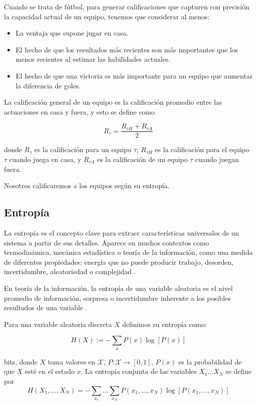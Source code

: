 Cuando se trata de fútbol, para generar calificaciones que capturen con precisión la
capacidad actual de un equipo, tenemos que considerar al menos:
\begin{itemize}
    \item La ventaja que supone jugar en casa.
    \item El hecho de que los resultados más recientes son más importantes que los menos recientes
    al estimar las habilidades actuales.
    \item El hecho de que una victoria es más importante para un equipo que aumentar la diferencia de goles.
\end{itemize}

\begin{definicion} \label{def:ratings}
La calificación general de un equipo es la calificación promedio entre las actuaciones 
en casa y fuera, y esto se define como

$$ R_{\tau}= \frac{R_{\tau H} + R_{\tau A}}{2} $$

donde $R_{\tau}$ es la calificación para un equipo $\tau$, $R_{\tau H}$ es la calificación para el 
equipo $\tau$ cuando juega en casa, y $R_{\tau A}$ es la calificación de un equipo $\tau$ cuando 
juegan fuera. 
\end{definicion}

Nosotros calificaremos a los equipos según su entropía.

\subsection{Entropía}
La entropía es el concepto clave para extraer características universales de un sistema a partir de sus 
detalles. Aparece en muchos contextos como termodinámica, mecánica estadística o teoría de la información, como 
una medida de diferentes propiedades: energía que no puede producir trabajo, desorden, incertidumbre, 
aleatoriedad o complejidad \cite{gen-entr-review}.

En teoría de la información, la entropía de una variable aleatoria es el nivel promedio de información, 
sorpresa o incertidumbre inherente a los posibles resultados de una variable \cite{t-entropy}.
\begin{definicion}[Entropía] \label{def:entropy}
Para una variable aleatoria discreta $X$ definimos su entropía como:  

$$H(X):= - \sum_{x} P(x)\log[P(x)]$$

bits, donde $X$ toma valores en $\mathcal{X}$, $P:\mathcal{X} \rightarrow [0,1]$, $P(x)$ es la 
probabilidad de que $X$ esté en el estado $x$. La 
entropía conjunta de las variables $X_1...X_N$ se define por 
$$H(X_1,...,X_N)=-\sum_{x_1}...\sum_{x_N}P(x_1,...,x_N)\log[P(x_1,...,x_N)]$$
\end{definicion}

